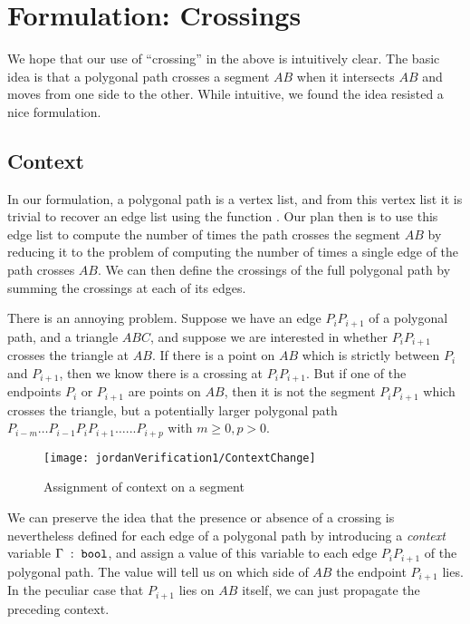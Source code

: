
\section{Formulation: Crossings}
We hope that our use of ``crossing'' in the above is intuitively clear. The basic idea is that a polygonal path crosses a segment $AB$ when it intersects $AB$ and moves from one side to the other. While intuitive, we found the idea resisted a nice formulation.

\subsection{Context}
In our formulation, a polygonal path is a vertex list, and from this vertex list it is trivial to recover an edge list using the function . Our plan then is to use this edge list to compute the number of times the path crosses the segment $AB$ by reducing it to the problem of computing the number of times a single edge of the path crosses $AB$. We can then define the crossings of the full polygonal path by summing the crossings at each of its edges. 

There is an annoying problem. Suppose we have an edge $P_iP_{i+1}$ of a polygonal path, and a triangle $ABC$, and suppose we are interested in whether $P_iP_{i+1}$ crosses the triangle at $AB$. If there is a point on $AB$ which is strictly between $P_i$ and $P_{i+1}$, then we know there is a crossing at $P_iP_{i+1}$. But if one of the endpoints $P_{i}$ or $P_{i+1}$ are points on $AB$, then it is not the segment $P_iP_{i+1}$ which crosses the triangle, but a potentially larger polygonal path $P_{i-m}\ldots P_{i-1}P_iP_{i+1}\ldots...P_{i+p}$ with $m \geq 0, p > 0$. 

\begin{figure}
\centering\texttt{[image: jordanVerification1/ContextChange]}
\caption{Assignment of context on a segment}
\label{fig:ContextChanges}
\end{figure}

We can preserve the idea that the presence or absence of a crossing is nevertheless defined for each edge of a polygonal path by introducing a \emph{context} variable $\Gamma\;:\;\texttt{bool}$, and assign a value of this variable to each edge $P_iP_{i+1}$ of the polygonal path. The value will tell us on which side of $AB$ the endpoint $P_{i+1}$ lies. In the peculiar case that $P_{i+1}$ lies on $AB$ itself, we can just propagate the preceding context.

